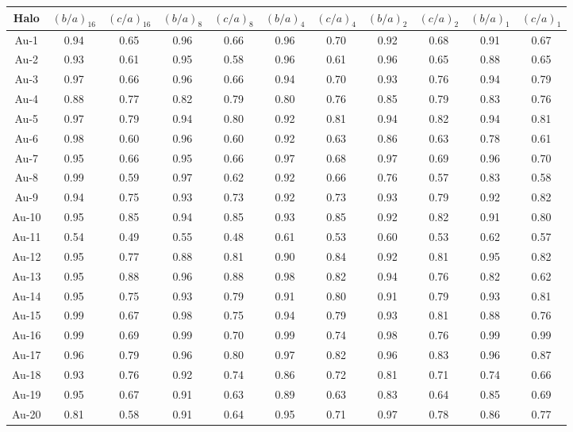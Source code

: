 \documentclass[usenatbib]{mnras}
\begin{document}
\begin{table}
  \centering 
  \begin{tabular}{c c c c c c c c c c c}
  \hline\hline
  Halo & $(b/a)_{16}$ & $(c/a)_{16}$& $(b/a)_{8}$ & $(c/a)_{8}$& $(b/a)_{4}$ & $(c/a)_{4}$& $(b/a)_{2}$ & $(c/a)_{2}$& $(b/a)_{1}$ & $(c/a)_{1}$ \\
  \hline
Au-1 & 0.94 & 0.65 & 0.96 & 0.66 & 0.96 & 0.70 & 0.92 & 0.68 & 0.91 & 0.67\\
Au-2 & 0.93 & 0.61 & 0.95 & 0.58 & 0.96 & 0.61 & 0.96 & 0.65 & 0.88 & 0.65\\
Au-3 & 0.97 & 0.66 & 0.96 & 0.66 & 0.94 & 0.70 & 0.93 & 0.76 & 0.94 & 0.79\\
Au-4 & 0.88 & 0.77 & 0.82 & 0.79 & 0.80 & 0.76 & 0.85 & 0.79 & 0.83 & 0.76\\
Au-5 & 0.97 & 0.79 & 0.94 & 0.80 & 0.92 & 0.81 & 0.94 & 0.82 & 0.94 & 0.81\\
Au-6 & 0.98 & 0.60 & 0.96 & 0.60 & 0.92 & 0.63 & 0.86 & 0.63 & 0.78 & 0.61\\
Au-7 & 0.95 & 0.66 & 0.95 & 0.66 & 0.97 & 0.68 & 0.97 & 0.69 & 0.96 & 0.70\\
Au-8 & 0.99 & 0.59 & 0.97 & 0.62 & 0.92 & 0.66 & 0.76 & 0.57 & 0.83 & 0.58\\
Au-9 & 0.94 & 0.75 & 0.93 & 0.73 & 0.92 & 0.73 & 0.93 & 0.79 & 0.92 & 0.82\\
Au-10 & 0.95 & 0.85 & 0.94 & 0.85 & 0.93 & 0.85 & 0.92 & 0.82 & 0.91 & 0.80\\
Au-11 & 0.54 & 0.49 & 0.55 & 0.48 & 0.61 & 0.53 & 0.60 & 0.53 & 0.62 & 0.57\\
Au-12 & 0.95 & 0.77 & 0.88 & 0.81 & 0.90 & 0.84 & 0.92 & 0.81 & 0.95 & 0.82\\
Au-13 & 0.95 & 0.88 & 0.96 & 0.88 & 0.98 & 0.82 & 0.94 & 0.76 & 0.82 & 0.62\\
Au-14 & 0.95 & 0.75 & 0.93 & 0.79 & 0.91 & 0.80 & 0.91 & 0.79 & 0.93 & 0.81\\
Au-15 & 0.99 & 0.67 & 0.98 & 0.75 & 0.94 & 0.79 & 0.93 & 0.81 & 0.88 & 0.76\\
Au-16 & 0.99 & 0.69 & 0.99 & 0.70 & 0.99 & 0.74 & 0.98 & 0.76 & 0.99 & 0.99\\
Au-17 & 0.96 & 0.79 & 0.96 & 0.80 & 0.97 & 0.82 & 0.96 & 0.83 & 0.96 & 0.87\\
Au-18 & 0.93 & 0.76 & 0.92 & 0.74 & 0.86 & 0.72 & 0.81 & 0.71 & 0.74 & 0.66\\
Au-19 & 0.95 & 0.67 & 0.91 & 0.63 & 0.89 & 0.63 & 0.83 & 0.64 & 0.85 & 0.69\\
Au-20 & 0.81 & 0.58 & 0.91 & 0.64 & 0.95 & 0.71 & 0.97 & 0.78 & 0.86 & 0.77\\

\end{tabular}
\end{table}
\end{document}

